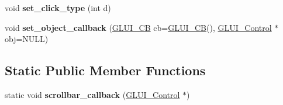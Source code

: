 \begin{DoxyCompactItemize}
\item 
\hypertarget{classGLUI__List_a6ef479e96208a8167bc6f13c235542ba}{void {\bfseries set\-\_\-click\-\_\-type} (int d)}\label{classGLUI__List_a6ef479e96208a8167bc6f13c235542ba}

\item 
\hypertarget{classGLUI__List_a97cb9eaebaa4b9748c7d1dcb0225b3ce}{void {\bfseries set\-\_\-object\-\_\-callback} (\hyperlink{classGLUI__CB}{G\-L\-U\-I\-\_\-\-C\-B} cb=\hyperlink{classGLUI__CB}{G\-L\-U\-I\-\_\-\-C\-B}(), \hyperlink{classGLUI__Control}{G\-L\-U\-I\-\_\-\-Control} $\ast$obj=N\-U\-L\-L)}\label{classGLUI__List_a97cb9eaebaa4b9748c7d1dcb0225b3ce}

\end{DoxyCompactItemize}
\subsection*{Static Public Member Functions}
\begin{DoxyCompactItemize}
\item 
\hypertarget{classGLUI__List_a84d5aee131e5f785ab8c67f3fd96c910}{static void {\bfseries scrollbar\-\_\-callback} (\hyperlink{classGLUI__Control}{G\-L\-U\-I\-\_\-\-Control} $\ast$)}\label{classGLUI__List_a84d5aee131e5f785ab8c67f3fd96c910}

\end{DoxyCompactItemize}

